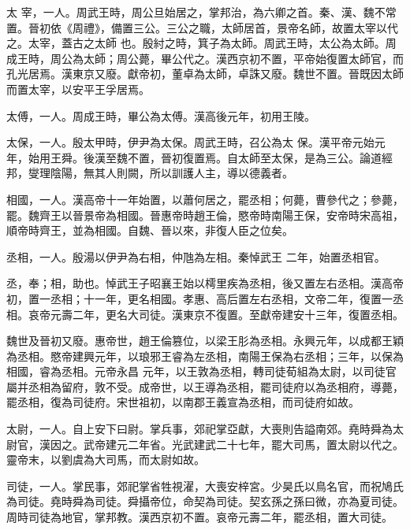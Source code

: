 
\begin{pinyinscope}

 太
 宰，一人。周武王時，周公旦始居之，掌邦治，為六卿之首。秦、漢、魏不常置。晉初依《周禮》，備置三公。三公之職，太師居首，景帝名師，故置太宰以代之。太宰，蓋古之太師
 也。殷紂之時，箕子為太師。周武王時，太公為太師。周成王時，周公為太師；周公薨，畢公代之。漢西京初不置，平帝始復置太師官，而孔光居焉。漢東京又廢。獻帝初，董卓為太師，卓誅又廢。魏世不置。晉既因太師而置太宰，以安平王孚居焉。



 太傅，一人。周成王時，畢公為太傅。漢高後元年，初用王陵。



 太保，一人。殷太甲時，伊尹為太保。周武王時，召公為太
 保。漢平帝元始元年，始用王舜。後漢至魏不置，晉初復置焉。自太師至太保，是為三公。論道經邦，燮理陰陽，無其人則闕，所以訓護人主，導以德義者。



 相國，一人。漢高帝十一年始置，以蕭何居之，罷丞相；何薨，曹參代之；參薨，罷。魏齊王以晉景帝為相國。晉惠帝時趙王倫，愍帝時南陽王保，安帝時宋高祖，順帝時齊王，並為相國。自魏、晉以來，非復人臣之位矣。



 丞相，一人。殷湯以伊尹為右相，仲虺為左相。秦悼武王
 二年，始置丞相官。



 丞，奉；相，助也。悼武王子昭襄王始以樗里疾為丞相，後又置左右丞相。漢高帝初，置一丞相；十一年，更名相國。孝惠、高后置左右丞相，文帝二年，復置一丞相。哀帝元壽二年，更名大司徒。漢東京不復置。至獻帝建安十三年，復置丞相。



 魏世及晉初又廢。惠帝世，趙王倫篡位，以梁王肜為丞相。永興元年，以成都王穎為丞相。愍帝建興元年，以琅邪王睿為左丞相，南陽王保為右丞相；三年，以保為相國，睿為丞相。元帝永昌
 元年，以王敦為丞相，轉司徒荀組為太尉，以司徒官屬并丞相為留府，敦不受。成帝世，以王導為丞相，罷司徒府以為丞相府，導薨，罷丞相，復為司徒府。宋世祖初，以南郡王義宣為丞相，而司徒府如故。



 太尉，一人。自上安下曰尉。掌兵事，郊祀掌亞獻，大喪則告謚南郊。堯時舜為太尉官，漢因之。武帝建元二年省。光武建武二十七年，罷大司馬，置太尉以代之。靈帝末，以劉虞為大司馬，而太尉如故。



 司徒，一人。掌民事，郊祀掌省牲視濯，大喪安梓宮。少昊氏以鳥名官，而祝鳩氏為司徒。堯時舜為司徒。舜攝帝位，命契為司徒。契玄孫之孫曰微，亦為夏司徒。周時司徒為地官，掌邦教。漢西京初不置。哀帝元壽二年，罷丞相，置大司徒。




\end{pinyinscope}
